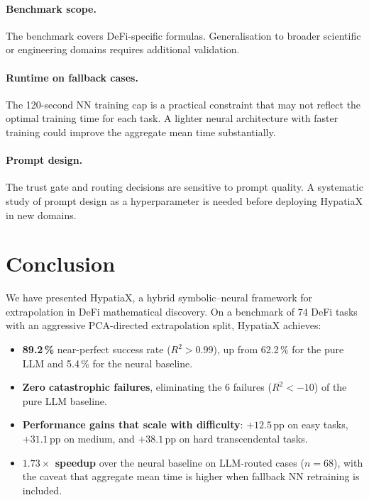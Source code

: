 \documentclass[twoside,11pt]{article}
\newcommand{\Rsq}{R^{2}}
\begin{document}
\paragraph{Benchmark scope.}
The benchmark covers DeFi-specific formulas.  Generalisation to broader scientific
or engineering domains requires additional validation.

\paragraph{Runtime on fallback cases.}
The 120-second NN training cap is a practical constraint that may not reflect the
optimal training time for each task.  A lighter neural architecture with faster
training could improve the aggregate mean time substantially.

\paragraph{Prompt design.}
The trust gate and routing decisions are sensitive to prompt quality.  A systematic
study of prompt design as a hyperparameter is needed before deploying HypatiaX
in new domains.

\section{Conclusion}
\label{sec:conclusion}

We have presented HypatiaX, a hybrid symbolic--neural framework for extrapolation
in DeFi mathematical discovery.  On a benchmark of 74 DeFi tasks with an aggressive
PCA-directed extrapolation split, HypatiaX achieves:

\begin{itemize}
  \item \textbf{89.2\,\%} near-perfect success rate ($\Rsq > 0.99$), up from
    62.2\,\% for the pure LLM and 5.4\,\% for the neural baseline.
  \item \textbf{Zero catastrophic failures}, eliminating the 6 failures ($\Rsq < -10$)
    of the pure LLM baseline.
  \item \textbf{Performance gains that scale with difficulty}: $+12.5$\,pp on easy tasks,
    $+31.1$\,pp on medium, and $+38.1$\,pp on hard transcendental tasks.
  \item \textbf{$1.73\times$ speedup} over the neural baseline on LLM-routed cases
    ($n=68$), with the caveat that aggregate mean time is higher when fallback NN
    retraining is included.
\end{itemize}
\end{document}
